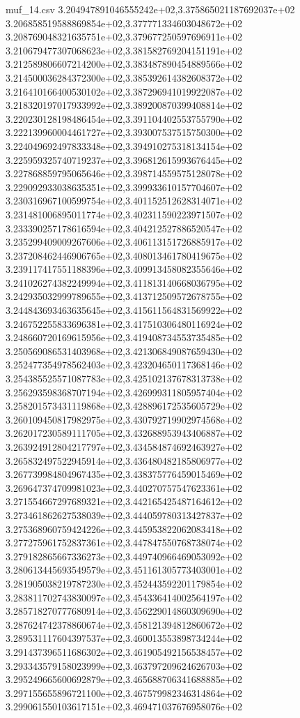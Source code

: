 \begin{filecontents*}{muf_14.csv}
3.204947891046555242e+02,3.375865021187692037e+02
3.206858519588869854e+02,3.377771334603048672e+02
3.208769048321635751e+02,3.379677250597696911e+02
3.210679477307068623e+02,3.381582769204151191e+02
3.212589806607214200e+02,3.383487890454889566e+02
3.214500036284372300e+02,3.385392614382608372e+02
3.216410166400530102e+02,3.387296941019922087e+02
3.218320197017933992e+02,3.389200870399408814e+02
3.220230128198486454e+02,3.391104402553755790e+02
3.222139960004461727e+02,3.393007537515750300e+02
3.224049692497833348e+02,3.394910275318134154e+02
3.225959325740719237e+02,3.396812615993676445e+02
3.227868859795065646e+02,3.398714559575128078e+02
3.229092933038635351e+02,3.399933610157704607e+02
3.230316967100599754e+02,3.401152512628314071e+02
3.231481006895011774e+02,3.402311590223971507e+02
3.233390257178616594e+02,3.404212527886520547e+02
3.235299409009267606e+02,3.406113151726885917e+02
3.237208462446906765e+02,3.408013461780419675e+02
3.239117417551188396e+02,3.409913458082355646e+02
3.241026274382249994e+02,3.411813140668036795e+02
3.242935032999789655e+02,3.413712509572678755e+02
3.244843693463635645e+02,3.415611564831569922e+02
3.246752255833696381e+02,3.417510306480116924e+02
3.248660720169615956e+02,3.419408734553735485e+02
3.250569086531403968e+02,3.421306849087659430e+02
3.252477354978562403e+02,3.423204650117368146e+02
3.254385525571087783e+02,3.425102137678313738e+02
3.256293598368707194e+02,3.426999311805957404e+02
3.258201573431119868e+02,3.428896172535605729e+02
3.260109450817982975e+02,3.430792719902974568e+02
3.262017230589111705e+02,3.432688953943406887e+02
3.263924912804217797e+02,3.434584874692463927e+02
3.265832497522945914e+02,3.436480482185806977e+02
3.267739984804967435e+02,3.438375776459015469e+02
3.269647374709981023e+02,3.440270757547623361e+02
3.271554667297689321e+02,3.442165425487164612e+02
3.273461862627538039e+02,3.444059780313427837e+02
3.275368960759424226e+02,3.445953822062083418e+02
3.277275961752837361e+02,3.447847550768738074e+02
3.279182865667336273e+02,3.449740966469053092e+02
3.280613445693549579e+02,3.451161305773403001e+02
3.281905038219787230e+02,3.452443592201179854e+02
3.283811702743830097e+02,3.454336414002564197e+02
3.285718270777680914e+02,3.456229014860309690e+02
3.287624742378860674e+02,3.458121394812860672e+02
3.289531117604397537e+02,3.460013553898734244e+02
3.291437396511686302e+02,3.461905492156538457e+02
3.293343579158023999e+02,3.463797209624626703e+02
3.295249665600692879e+02,3.465688706341688885e+02
3.297155655896721100e+02,3.467579982346314864e+02
3.299061550103617151e+02,3.469471037676958076e+02

\end{filecontents*}
